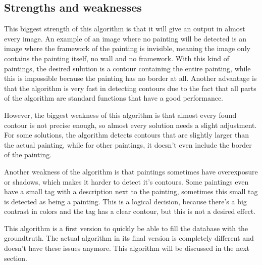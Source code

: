 \subsection{Strengths and weaknesses}

This biggest strength of this algorithm is that it will give an output in almost every image. An example of an image where no painting will be detected is an image where the framework of the painting is invisible, meaning the image only contains the painting itself, no wall and no framework. With this kind of paintings, the desired sulution is a contour containing the entire painting, while this is impossible because the painting has no border at all. Another advantage is that the algorithm is very fast in detecting contours due to the fact that all parts of the algorithm are standard functions that have a good performance.

However, the biggest weakness of this algorithm is that almost every found contour is not precise enough, so almost every solution needs a slight adjustment. For some solutions, the algorithm detects contours that are slightly larger than the actual painting, while for other paintings, it doesn't even include the border of the painting.

Another weakness of the algorithm is that paintings sometimes have overexposure or shadows, which makes it harder to detect it's contours. Some paintings even have a small tag with a description next to the painting, sometimes this small tag is detected as being a painting. This is a logical decision, because there's a big contrast in colors and the tag has a clear contour, but this is not a desired effect.

This algorithm is a first version to quickly be able to fill the database with the groundtruth. The actual algorithm in its final version is completely different and doesn't have these issues anymore. This algorithm will be discussed in the next section.